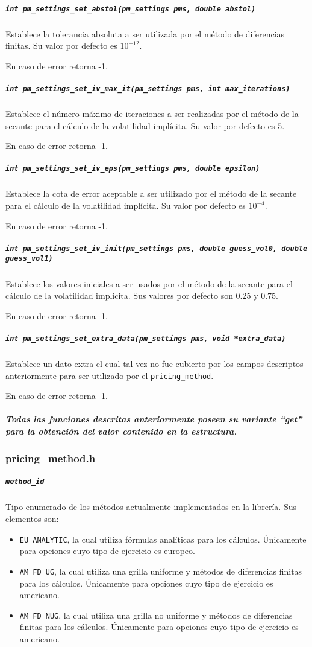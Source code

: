 \documentclass[12pt,a4paper,final]{article}
\begin{document}
			\subparagraph{\texttt{int pm\_settings\_set\_abstol(pm\_settings pms, double abstol)}}
				Establece la tolerancia absoluta a ser utilizada por el método de diferencias finitas.
				Su valor por defecto es $10^{-12}$.
				
				En caso de error retorna -1.
				
			\subparagraph{\texttt{int pm\_settings\_set\_iv\_max\_it(pm\_settings pms, int max\_iterations)}}
				Establece el número máximo de iteraciones a ser realizadas por el método de la secante
				para el cálculo de la volatilidad implícita. Su valor por defecto es 5.
				
				En caso de error retorna -1.
				
			\subparagraph{\texttt{int pm\_settings\_set\_iv\_eps(pm\_settings pms, double epsilon)}}
				Establece la cota de error aceptable a ser utilizado por el método de la secante 
				para el cálculo de la volatilidad implícita. Su valor por defecto es $10^{-4}$.
				
				En caso de error retorna -1.
				
			\subparagraph{\texttt{int pm\_settings\_set\_iv\_init(pm\_settings pms, double guess\_vol0, double guess\_vol1)}}
				Establece los valores iniciales a ser usados por el método de la secante para el cálculo
				de la volatilidad implícita. Sus valores por defecto son 0.25 y 0.75.
				
				En caso de error retorna -1.
				
			\subparagraph{\texttt{int pm\_settings\_set\_extra\_data(pm\_settings pms, void *extra\_data)}}
				Establece un dato extra el cual tal vez no fue cubierto por los campos descriptos anteriormente
				para ser utilizado por el \texttt{pricing\_method}.
				
				En caso de error retorna -1.
			
			\subparagraph{Todas las funciones descritas anteriormente poseen su variante ``get''
				 para la obtención del valor contenido en la estructura.}
				
		\subsubsection{pricing\_method.h}
			
			\subparagraph{\texttt{method\_id}}
				Tipo enumerado de los métodos actualmente implementados en la librería.
				Sus elementos son: 
				\begin{itemize}
					\item \texttt{EU\_ANALYTIC}, la cual utiliza fórmulas analíticas
						para los cálculos. Únicamente para opciones cuyo tipo de ejercicio es europeo.
					\item \texttt{AM\_FD\_UG}, la cual utiliza una grilla uniforme y métodos
						de diferencias finitas para los cálculos. Únicamente para opciones 
						cuyo tipo de ejercicio es americano.
					\item \texttt{AM\_FD\_NUG}, la cual utiliza una grilla no uniforme y métodos
						de diferencias finitas para los cálculos. Únicamente para opciones
						cuyo tipo de ejercicio es americano.
				\end{itemize}
				
\end{document}
